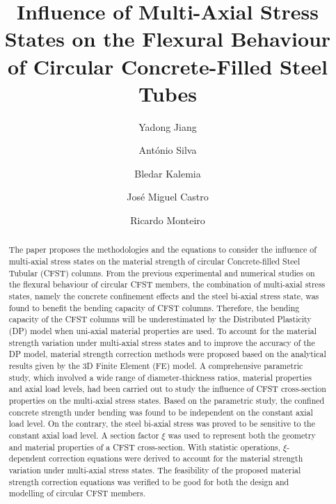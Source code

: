\documentclass[12pt,a4]{article}
\title{Influence of Multi-Axial Stress States on the Flexural Behaviour of Circular Concrete-Filled Steel Tubes}
\author{Yadong Jiang \and António Silva \and Bledar Kalemia \and José Miguel Castro \and Ricardo Monteiro}
\date{}
\begin{document}
	\maketitle
	
	\begin{abstract}
		The paper proposes the methodologies and the equations to consider the influence of multi-axial stress states on the material strength of circular Concrete-filled Steel Tubular (CFST) columns. From the previous experimental and numerical studies on the flexural behaviour of circular CFST members, the combination of multi-axial stress states, namely the concrete confinement effects and the steel bi-axial stress state, was found to benefit the bending capacity of CFST columns. Therefore, the bending capacity of the CFST columns will be underestimated by the Distributed Plasticity (DP) model when uni-axial material properties are used. To account for the material strength variation under multi-axial stress states and to improve the accuracy of the DP model, material strength correction methods were proposed based on the analytical results given by the 3D Finite Element (FE) model. A comprehensive parametric study, which involved a wide range of diameter-thickness ratios, material properties and axial load levels, had been carried out to study the influence of CFST cross-section properties on the multi-axial stress states. Based on the parametric study, the confined concrete strength under bending was found to be independent on the constant axial load level. On the contrary, the steel bi-axial stress was proved to be sensitive to the constant axial load level. A section factor $\xi$ was used to represent both the geometry and material properties of a CFST cross-section. With statistic operations, $\xi$-dependent correction equations were derived to account for the material strength variation under multi-axial stress states. The feasibility of the proposed material strength correction equations was verified to be good for both the design and modelling of circular CFST members.
	\end{abstract}
\end{document}
